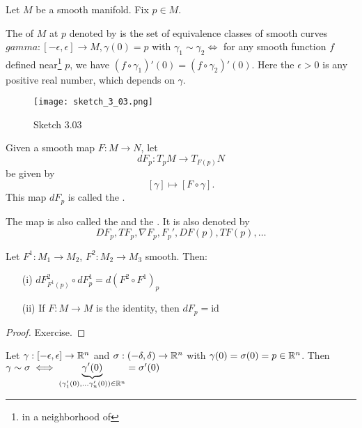 Let \(M\) be a smooth manifold. Fix \(p\in M\). 
\begin{definition*}
    The  of \(M\) at \(p\) denoted by  is 
    the set of equivalence classes of smooth curves \(gamma:[-\epsilon,\epsilon]\to M,\gamma(0)=p\)
    with \(\gamma_1\sim\gamma_2\iff\) for any smooth function \(f\) defined near\footnote{in a neighborhood of} \(p\), we have 
    \((f\circ\gamma_1)'(0)=(f\circ \gamma_2)'(0)\). Here the \(\epsilon>0\) is any positive real number, which depends on \(\gamma\).
\end{definition*} 
\begin{figure}[H]
    \centering
    \texttt{[image: sketch\_3\_03.png]}
    \caption{Sketch 3.03}
\end{figure}

\begin{definition*}
    Given a smooth map \(F:M\to N\), let
    \[dF_p:T_pM\to T_{F(p)}N\]
    be given by 
    \[[\gamma]\mapsto [F\circ\gamma].\]
    This map \(dF_p\) is called the .
\end{definition*}

\begin{remark}
    The map is also called the  and the .
    It is also denoted by \[DF_p,TF_p,\nabla F_p,F_p',DF(p),TF(p),\dots\]
\end{remark}

\begin{lemma}\label{lem:3.1}
    Let \(F^1:M_1\to M_2\), \(F^2:M_2\to M_3\) smooth. Then:
    \begin{enumerate}
        \item[(i)]\(dF^2_{F^1(p)}\circ dF_p^1=d(F^2\circ F^1)_p\)
        \item[(ii)] If \(F:M\to M\) is the identity, then \(dF_p=\text{id}\)  
    \end{enumerate}
\end{lemma}

\begin{proof}
    Exercise.
\end{proof}


\begin{lemma}\label{lem:3.2}
    Let \(\gamma:[-\epsilon,\epsilon]\to \mathbb{R}^n\) and \(\sigma:(-\delta,\delta)\to \mathbb{R}^n\)
    with \(\gamma(0)=\sigma(0)=p\in\mathbb{R}^n\). Then \(\gamma\sim \sigma\iff \underbrace{\gamma'(0)}_{(\gamma_1'(0),\dots \gamma_n'(0))\in\mathbb{R}^n}=\sigma'(0)\)
\end{lemma}


